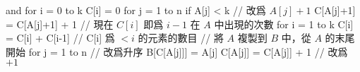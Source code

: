 \startCLRSCODE
{} and 
for i = 0 to k
	C[i] = 0
for j = 1 to n
	if A[j] < k		// 改爲 $A[j]+1$
		C[A[j]+1] = C[A[j]+1] + 1
// 現在 $C[i]$ 即爲 $i-1$ 在 $A$ 中出現的次數
for i = 1 to k
	C[i] = C[i] + C[i-1]
// C[i] 爲 $< i$ 的元素的數目
// 將 $A$ 複製到 $B$ 中，從 $A$ 的末尾開始
for j = 1 to n		// 改爲升序
	B[C[A[j]]] = A[j]
	C[A[j]] = C[A[j]] + 1	// 改爲 $+1$
\stopCLRSCODE

